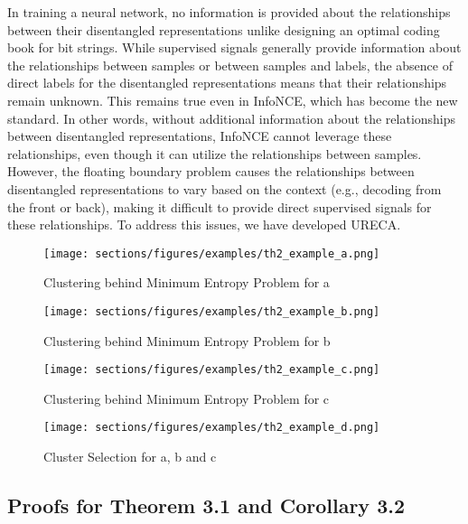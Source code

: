 In training a neural network, no information is provided about the relationships between their disentangled representations unlike designing an optimal coding book for bit strings.
While supervised signals generally provide information about the relationships 
between samples or between samples and labels, 
the absence of direct labels for the disentangled representations means that their relationships remain unknown.
This remains true even in InfoNCE, which has become the new standard.
In other words, without additional information about the relationships between disentangled representations, 
InfoNCE cannot leverage these relationships, even though it can utilize the relationships between samples.
However, the floating boundary problem causes the relationships between disentangled representations 
to vary based on the context (e.g., decoding from the front or back), 
making it difficult to provide direct supervised signals for these relationships.
To address this issues, we have developed URECA.

\newpage
\begin{figure}[!h]
\centering
\texttt{[image: sections/figures/examples/th2\_example\_a.png]} 
\caption{Clustering behind Minimum Entropy Problem for a}
\label{fig_ex1}
\end{figure}

\begin{figure}[!]
\centering
\texttt{[image: sections/figures/examples/th2\_example\_b.png]} 
\caption{Clustering behind Minimum Entropy Problem for b}
\label{fig_ex2}
\end{figure}

\newpage
\begin{figure}[!t]
\centering
\texttt{[image: sections/figures/examples/th2\_example\_c.png]} 
\caption{Clustering behind Minimum Entropy Problem for c}
\label{fig_ex3}
\end{figure}

\begin{figure}[!]
\centering
\texttt{[image: sections/figures/examples/th2\_example\_d.png]} 
\caption{Cluster Selection for a, b and c }
\label{fig_ex4}
\end{figure}

\newpage
\subsection{Proofs for Theorem 3.1 and Corollary 3.2}

